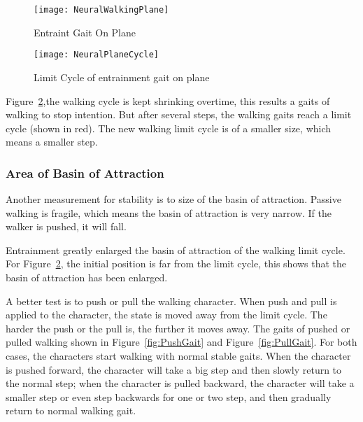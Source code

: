 \begin{figure}[!htbp]
  \begin{center}
     \texttt{[image: NeuralWalkingPlane]}
    \caption{Entraint Gait On Plane}
    \label{fig:neuralwalkinggait}
\end{center}
\end{figure}

\begin{figure}[!htbp]
  \begin{center}
      \texttt{[image: NeuralPlaneCycle]}
    \caption{Limit Cycle of entrainment gait on plane}
    \label{fig:entrainmentLimitCycleOnPlane}
\end{center}
\end{figure}

Figure~\ref{fig:entrainmentLimitCycleOnPlane},the walking cycle is kept shrinking overtime, this results a gaits of walking to stop intention. 
But after several steps, the walking gaits reach a limit cycle (shown in red). 
The new walking limit cycle is of a smaller size, which means a smaller step.


\subsubsection*{Area of Basin of Attraction}
Another measurement for stability is to size of the basin of attraction.
Passive walking is fragile, which means the basin of attraction is very narrow.
If the walker is pushed, it will fall.

Entrainment greatly enlarged the basin of attraction of the walking limit cycle.
For Figure~\ref{fig:entrainmentLimitCycleOnPlane}, the initial position is far from the limit cycle, this shows that the basin of attraction has been enlarged.

A better test is to push or pull the walking character.
When push and pull is applied to the character, the state is moved away from the limit cycle.
The harder the push or the pull is, the further it moves away.
The gaits of  pushed or pulled walking shown in Figure~\ref{fig:PushGait} and Figure~\ref{fig:PullGait}.
For both cases, the characters start walking with normal stable gaits.
When the character is pushed forward, the character will take a big step and then slowly return to the normal step;
when the character is pulled backward, the character will take a smaller step or even step backwards for one or two step, and then gradually return to normal walking gait.


